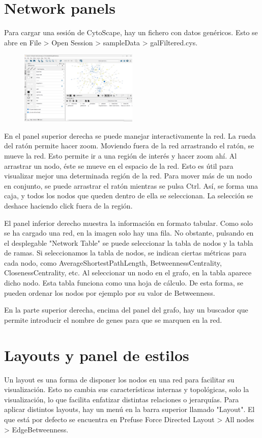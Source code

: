\documentclass[nochap]{config/ejercicios}
\begin{document}
\section{Network panels}
Para cargar una sesión de CytoScape, hay un fichero con datos genéricos. Esto se abre en File > Open Session > sampleData > galFiltered.cys.

\begin{figure}[h]
\centering
\includegraphics[width = 0.5\textwidth]{figs/sampledata.png}
\end{figure}

En el panel superior derecha se puede manejar interactivamente la red. La rueda del ratón permite hacer zoom. Moviendo fuera de la red arrastrando el ratón, se mueve la red. Esto permite ir a una región de interés y hacer zoom ahí. Al arrastrar un nodo, éste se mueve en el espacio de la red. Esto es útil para visualizar mejor una determinada región de la red. Para mover más de un nodo en conjunto, se puede arrastrar el ratón mientras se pulsa Ctrl. Así, se forma una caja, y todos los nodos que queden dentro de ella se seleccionan. La selección se deshace haciendo click fuera de la región. 

El panel inferior derecho muestra la información en formato tabular. Como solo se ha cargado una red, en la imagen solo hay una fila. No obstante, pulsando en el desplegable "Network Table" se puede seleccionar la tabla de nodos y la tabla de ramas. Si seleccionamos la tabla de nodos, se indican ciertas métricas para cada nodo, como AverageShortestPathLength, BetweennessCentrality, ClosenessCentrality, etc. Al seleccionar un nodo en el grafo, en la tabla aparece dicho nodo. Esta tabla funciona como una hoja de cálculo. De esta forma, se pueden ordenar los nodos por ejemplo por su valor de Betweenness.

En la parte superior derecha, encima del panel del grafo, hay un buscador que permite introducir el nombre de genes para que se marquen en la red. 

\section{Layouts y panel de estilos}
Un layout es una forma de disponer los nodos en una red para facilitar su visualización. Esto no cambia sus características internas y topológicas, solo la visualización, lo que facilita enfatizar distintas relaciones o jerarquías. Para aplicar distintos layouts, hay un menú en la barra superior llamado "Layout". El que está por defecto se encuentra en Prefuse Force Directed Layout > All nodes > EdgeBetweenness.
\end{document}
